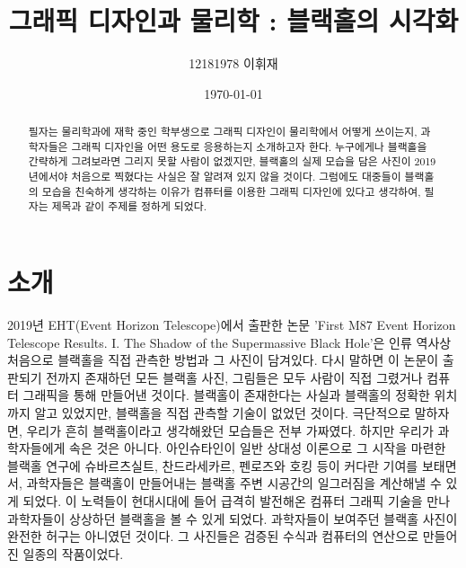 \documentclass[
    aps,
    reprint,
    superscriptaddress,
    ]{revtex4-2}
\begin{document}
\title{그래픽 디자인과 물리학 : 블랙홀의 시각화}

\author{12181978 이휘재}

\date{\today}


\begin{abstract}
필자는 물리학과에 재학 중인 학부생으로 그래픽 디자인이 물리학에서 어떻게 쓰이는지, 과학자들은
그래픽 디자인을 어떤 용도로 응용하는지 소개하고자 한다. 누구에게나 블랙홀을 간략하게 그려보라면
그리지 못할 사람이 없겠지만, 블랙홀의 실제 모습을 담은 사진이 2019년에서야 처음으로 찍혔다는 
사실은 잘 알려져 있지 않을 것이다. 그럼에도 대중들이 블랙홀의 모습을 친숙하게 생각하는 
이유가 컴퓨터를 이용한 그래픽 디자인에 있다고 생각하여, 필자는 제목과 같이 주제를 정하게 되었다.  
\end{abstract}

\maketitle

\section[Introduction]{소개}
2019년 EHT(Event Horizon Telescope)에서 출판한 논문 'First M87 Event Horizon Telescope Results. I.
The Shadow of the Supermassive Black Hole'은 인류 역사상 처음으로 블랙홀을 직접 관측한 방법과
그 사진이 담겨있다. 다시 말하면 이 논문이 출판되기 전까지 존재하던 모든 블랙홀 사진, 그림들은
모두 사람이 직접 그렸거나 컴퓨터 그래픽을 통해 만들어낸 것이다. 블랙홀이 존재한다는 사실과
블랙홀의 정확한 위치까지 알고 있었지만, 블랙홀을 직접 관측할 기술이 없었던 것이다. 극단적으로 말하자면, 
우리가 흔히 블랙홀이라고 생각해왔던 모습들은 전부 가짜였다. 하지만 우리가 과학자들에게 속은 것은 아니다. 
아인슈타인이 일반 상대성 이론으로 그 시작을 마련한 블랙홀 연구에 슈바르츠실트, 찬드라세카르, 
펜로즈와 호킹 등이 커다란 기여를 보태면서, 과학자들은 블랙홀이 만들어내는 블랙홀 주변 시공간의 
일그러짐을 계산해낼 수 있게 되었다. 이 노력들이 현대시대에 들어 급격히 발전해온 컴퓨터 그래픽 기술을
만나 과학자들이 상상하던 블랙홀을 볼 수 있게 되었다. 과학자들이 보여주던 블랙홀 사진이 완전한 허구는 
아니였던 것이다. 그 사진들은 검증된 수식과 컴퓨터의 연산으로 만들어진 일종의 작품이었다.
\end{document}
